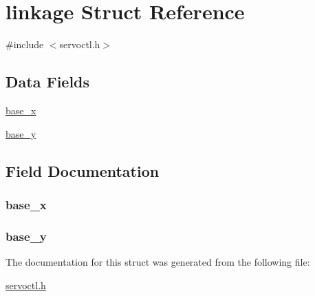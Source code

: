 \hypertarget{structlinkage}{}\section{linkage Struct Reference}
\label{structlinkage}


{\ttfamily \#include $<$servoctl.\+h$>$}

\subsection*{Data Fields}
\begin{DoxyCompactItemize}
\item 
\hyperlink{structlinkage_ab7212a9ff1ec58211f1b689374f11766}{base\+\_\+x}
\item 
\hyperlink{structlinkage_aed760843bedfbb6de7f205758ef0d49b}{base\+\_\+y}
\end{DoxyCompactItemize}


\subsection{Field Documentation}
\subsubsection[{\texorpdfstring{base\+\_\+x}{base_x}}]{\setlength{\rightskip}{0pt plus 5cm}base\+\_\+x}\hypertarget{structlinkage_ab7212a9ff1ec58211f1b689374f11766}{}\label{structlinkage_ab7212a9ff1ec58211f1b689374f11766}
\subsubsection[{\texorpdfstring{base\+\_\+y}{base_y}}]{\setlength{\rightskip}{0pt plus 5cm}base\+\_\+y}\hypertarget{structlinkage_aed760843bedfbb6de7f205758ef0d49b}{}\label{structlinkage_aed760843bedfbb6de7f205758ef0d49b}


The documentation for this struct was generated from the following file\+:\begin{DoxyCompactItemize}
\item 
\hyperlink{servoctl_8h}{servoctl.\+h}\end{DoxyCompactItemize}
